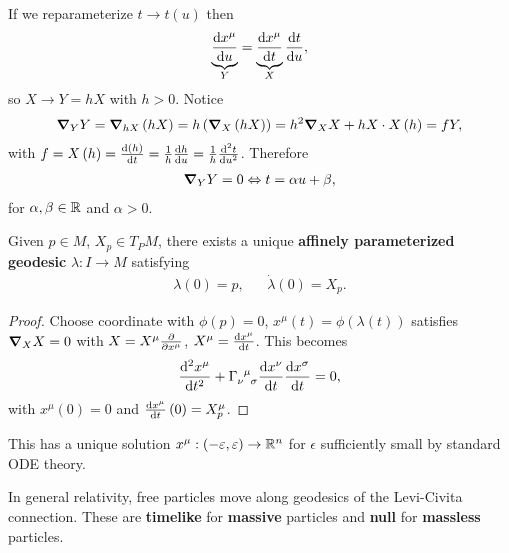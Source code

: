 
\begin{note}
    If we reparameterize $t \to t \left( u \right) $ then
    \begin{align}
        \underbrace{\dv{x^{\mu}}{u}}_{Y} = \underbrace{\dv{x^{\mu}}{t}}_{X} \dv{t}{u}
    ,\end{align}
    so $X \to Y = h X$ with $h > 0$. Notice
    \begin{align}
        \grad_Y Y = \grad_{hX}\left( hX \right) = h \left( \grad_X \left( h X \right)  \right) = h^2 \grad_{X} X + h X \cdot X \left( h \right)  = f Y
    ,\end{align}
    with $f = X \left( h \right) = \dv{\left( h \right) }{t} = \frac{1}{h} \dv{h}{u} = \frac{1}{h} \dv[2]{t}{u}$. Therefore
    \begin{align}
        \grad_{Y} Y = 0 \Leftrightarrow t = \alpha u + \beta
    ,\end{align}
    for $\alpha, \beta \in \mathbb{R}$ and $\alpha > 0$.
\end{note}


\begin{theorem}
    Given $p \in M$, $X_{p} \in T_P M$, there exists a unique \textbf{affinely parameterized geodesic} $\lambda : I \to M$ satisfying
    \begin{align}
        \lambda\left( 0 \right) = p, && \dot{\lambda} \left( 0 \right) = X_p
    .\end{align}
\end{theorem}

\begin{proof}
    Choose coordinate with $\phi \left( p \right) = 0$, $x^{\mu}\left( t \right) = \phi \left( \lambda \left( t \right)  \right) $ satisfies $\grad_X X = 0$ with $X = X^{\mu} \pdv{x^{\mu}}$, $X^{\mu} = \dv{x^{\mu}}{t}$. This becomes
    \begin{align}\label{eq:geodesic_3}
        \dv[2]{x^{\mu}}{t} + \tensor{\Gamma}{_{\nu}^{\mu}_{\sigma}} \dv{x^{\nu}}{t} \dv{x^{\sigma}}{t} = 0
    ,\end{align}
    with $x^{\mu}\left( 0 \right) = 0$ and $\dv{x^{\mu}}{t}\left( 0 \right) = X_{p}^{\mu}$.
\end{proof}

This has a unique solution $x^{\mu} : \left( -\varepsilon, \varepsilon \right) \to \mathbb{R}^{n}$ for $\epsilon$ sufficiently small by standard ODE theory.


\begin{postulate}
    In general relativity, free particles move along geodesics of the Levi-Civita connection. These are \textbf{timelike} for \textbf{massive} particles and \textbf{null} for \textbf{massless} particles.
\end{postulate}

